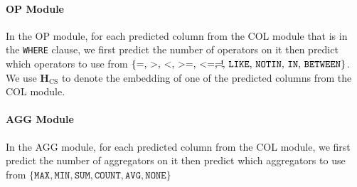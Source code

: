 \documentclass[11pt,a4paper]{article}
\begin{document}
\paragraph{OP Module}
In the OP module, for each predicted column from the COL module that is in the \texttt{WHERE} clause, we first predict the number of operators on it then predict which operators to use from $\{=,\, >,\, <,\, >=,\, <=,\, !\!\!\!\!\!\!\!=,\, \texttt{LIKE},\, \texttt{NOT\!\!\! IN},\, \texttt{IN},\, \texttt{BETWEEN}\}$.
We use $\mathbf{H}_{\textrm{CS}}$ to denote the embedding of one of the predicted columns from the COL module.



\paragraph{AGG Module}
In the AGG module, for each predicted column from the COL module, we first predict the number of aggregators on it then predict which aggregators to use from $\{\texttt{MAX},\texttt{MIN},\texttt{SUM},\texttt{COUNT},\texttt{AVG},\texttt{NONE}\}$


\end{document}
